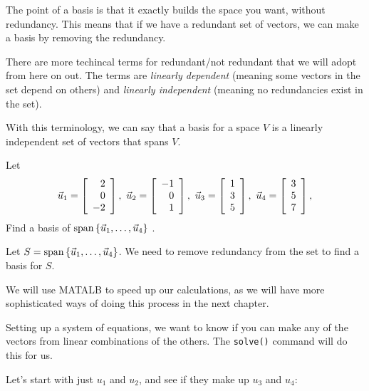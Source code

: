 \documentclass{ximera}
\begin{document}
\begin{exploration}

The point of a basis is that it exactly builds the space you want, without redundancy. This means that if we have a redundant set of vectors, we can make a basis by removing the redundancy. 

There are more techincal terms for redundant/not redundant that we will adopt from here on out. The terms are \emph{linearly dependent} (meaning some vectors in the set depend on others) and \emph{linearly independent} (meaning no redundancies exist in the set).

With this terminology, we can say that a basis for a space $V$ is a linearly independent set of vectors that spans $V$.

\begin{example}
  Let
  \begin{equation*}
    \vect{u}_1 = \startmat{r} 2 \\ 0 \\ -2 \stopmat,
    \quad
    \vect{u}_2 = \startmat{r} -1 \\ 0 \\ 1 \stopmat,
    \quad
    \vect{u}_3 = \startmat{r} 1 \\ 3 \\ 5 \stopmat,
    \quad
    \vect{u}_4 = \startmat{r} 3 \\ 5 \\ 7 \stopmat,
  \end{equation*}
  Find a basis of $\sspan\set{\vect{u}_1,\ldots,\vect{u}_4}$%
  .
\end{example}

\begin{solution}
  Let $S=\sspan\set{\vect{u}_1,\ldots,\vect{u}_4}$. We need to remove redundancy from the set to find a basis for $S$.

  We will use MATALB to speed up our calculations, as we will have more sophisticated ways of doing this process in the next chapter.

  Setting up a system of equations, we want to know if you can make any of the vectors from linear combinations of the others. The \texttt{solve()} command will do this for us.

  Let's start with just $u_1$ and $u_2$, and see if they make up $u_3$ and $u_4$:

  \begin{verbatim}
  

\end{verbatim}
\end{solution}
\end{exploration}
\end{document}
